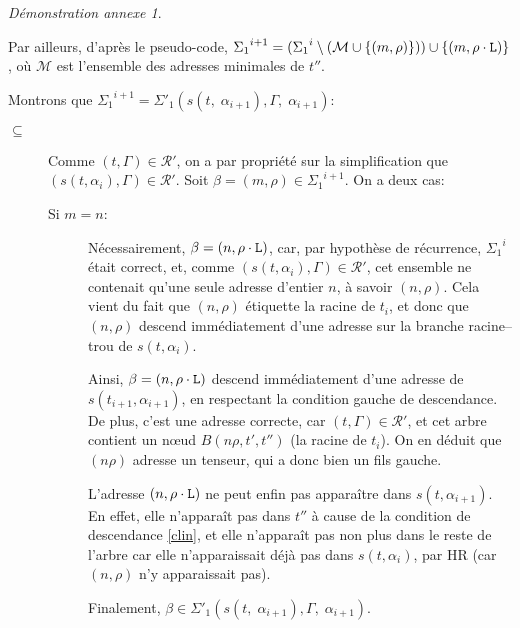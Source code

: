 \documentclass[11pt,a4paper]{article}
\theoremstyle{plain}
\theoremstyle{definition}
\theoremstyle{remark}
\newtheorem{demonstrationappendix}{Démonstration annexe}
\newcommand*{\someadd}{\rho}
\newcommand*{\sequent}{\Gamma}
\newcommand*{\Left}{\textnormal{\texttt{L}}}
\newcommand*{\representationspartial}{\ensuremath{\mathcal{R'}}}
\newcommand*{\highapprox}{\ensuremath{\Sigma_1}}
\newcommand*{\highapproxspec}{\ensuremath{\Sigma'_1}}
\newcommand*{\treesimplify}{\ensuremath{s}}
\begin{document}
\begin{demonstrationappendix}
\begin{description}
\begin{description}
            Par ailleurs, d'après le pseudo-code, ${\highapprox}^{i+1} = ({\highapprox}^{i}\setminus (\mathcal{M} \cup \{ (m, \someadd) \})) \cup \left\{ (m, \someadd \cdot \Left) \right\}$, où $\mathcal{M}$ est l'ensemble des adresses minimales de $t''$.

            Montrons que ${\highapprox}^{i+1} = \highapproxspec \left( \treesimplify( t, \; {\alpha}_{i+1} ), \sequent, \; {\alpha}_{i+1} \right)$:

            \begin{description}
                \item[$\subseteq$] 
                    Comme $(t, \sequent) \in \representationspartial$, on a par propriété sur la simplification que $(s(t, \alpha_{i}), \sequent) \in \representationspartial$. Soit $\beta = (m, \someadd) \in {\highapprox}^{i+1}$. On a deux cas:

                    \begin{description}
                        \item[Si $m = n$:] 
                            Nécessairement, $\beta = (n, \rho \cdot \Left)$, car, par hypothèse de récurrence, ${\highapprox}^{i}$ était correct, et, comme $(s(t, \alpha_{i}), \sequent) \in \representationspartial$, cet ensemble ne contenait qu'une seule adresse d'entier $n$, à savoir $(n, \rho)$. Cela vient du fait que $(n, \rho)$ étiquette la racine de $t_i$, et donc que $(n, \rho)$ descend immédiatement d'une adresse sur la branche racine--trou de $s(t, \alpha_{i})$.
                            
                            Ainsi, $\beta = (n, \rho \cdot \Left)$ descend immédiatement d'une adresse de $s(t_{i+1}, \alpha_{i+1})$, en respectant la condition gauche de descendance. De plus, c'est une adresse correcte, car $(t, \sequent) \in \representationspartial$, et cet arbre contient un n\oe ud $B(n \rho, t', t'')$ (la racine de $t_i$). On en déduit que $(n \rho)$ adresse un tenseur, qui a donc bien un fils gauche. 
                            
                            L'adresse $(n, \rho \cdot \Left)$ ne peut enfin pas apparaître dans $s(t, \alpha_{i+1})$. En effet, elle n'apparaît pas dans $t''$ à cause de la condition de descendance \ref{clin}, et elle n'apparaît pas non plus dans le reste de l'arbre car elle n'apparaissait déjà pas dans $s(t, \alpha_{i})$, par HR (car $(n, \rho)$ n'y apparaissait pas).

                            Finalement, $\beta \in \highapproxspec \left( \treesimplify( t, \; {\alpha}_{i+1} ), \sequent, \; {\alpha}_{i+1} \right)$.
                            

\end{description}
\end{description}
\end{description}
\end{description}
\end{demonstrationappendix}
\end{document}
